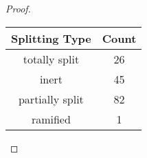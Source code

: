 \documentclass[10pt]{amsart}
\begin{document}
\begin{thm}
\begin{proof}
\begin{enumerate}[(a)]
        \begin{center}
          \begin{tabular}{|c|c|}
            \hline
            Splitting Type & Count\\
            \hline
            totally split & 26\\ 
            \hline
            inert & 45\\ 
            \hline
            partially split & 82 \\
            \hline
            ramified & 1\\
            \hline
          \end{tabular}
        \end{center}
    \end{enumerate}
  \end{proof}
\end{thm}
\end{document}
